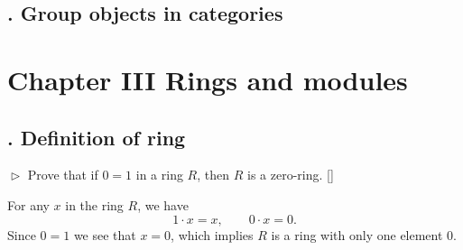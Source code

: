 \documentclass[12pt,letterpaper,boxed]{hmcpset}
\begin{document}
\subsection{. Group objects in categories}

\newpage
\section{Chapter III\hspace{0.2em} Rings and modules}

\subsection{. Definition of ring}
\begin{problem}[1.1]
	$\vartriangleright$ Prove that if $0 = 1$ in a ring $R$, then $R$ is a zero-ring. []
\end{problem}
\begin{solution}
	For any $x$ in the ring $R$, we have
	\[
	1\cdot x=x,\qquad 0\cdot x=0.
	\]
	Since $0 = 1$ we see that $x=0$, which implies $R$ is a ring with only one element $0$.
\end{solution}
\end{document}
